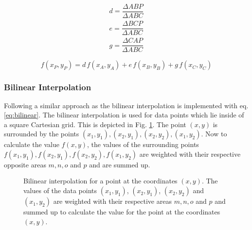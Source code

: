 \documentclass[11pt,twoside,a4paper,fleqn,x11names]{report}
\numberwithin{equation}{chapter}
\numberwithin{figure}{chapter}
\numberwithin{table}{chapter}
\begin{document}
\begin{equation}
	\begin{aligned}
		d = \dfrac{\Delta ABP}{\Delta ABC}\\
		e = \dfrac{\Delta BCP}{\Delta ABC}\\
		g = \dfrac{\Delta CAP}{\Delta ABC}
	\end{aligned}
	\label{eq:barycor}
\end{equation}

\begin{equation}
f(x_P,y_P) = d\,f(x_A,y_A)+e\,f(x_B,y_B)+g\,f(x_C,y_C)
\label{eq:baryeq}
\end{equation}

\subsubsection{Bilinear Interpolation}
\label{subsec:binterp}
Following a similar approach as \cite{bilinear} the bilinear interpolation is implemented with eq. \ref{eq:bilinear}. The bilinear interpolation is used for data points which lie inside of a square Cartesian grid. This is depicted in Fig. \ref{fig:bilinear}. The point $(x,y)$ is surrounded by the points $(x_1,y_1),(x_2,y_1),(x_2,y_2),(x_1,y_2)$. Now to calculate the value $f(x,y)$, the values of the surrounding points $f(x_1,y_1),f(x_2,y_1),f(x_2,y_2),f(x_1,y_2)$ are weighted with their respective opposite areas $m,n,o$ and $p$ and are summed up. 
\begin{figure}[!htbp]
	\centering
	\caption{Bilinear interpolation for a point at the coordinates $(x,y)$. The values of the data points $(x_1,y_1)$, $(x_2,y_1)$, $(x_2,y_2)$ and $(x_1,y_2)$ are weighted with their respective areas $m, n, o$ and $p$ and summed up to calculate the value for the point at the coordinates $(x,y)$.}
	\label{fig:bilinear}	
\end{figure}
\end{document}
